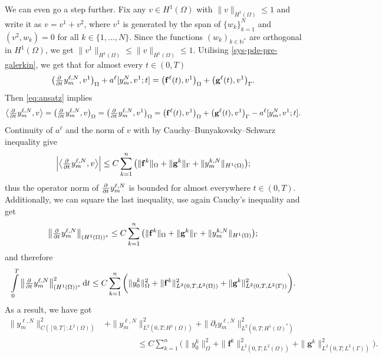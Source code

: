 \documentclass[11pt]{article}
\newcommand{\N}{\mathbb{N}}
\numberwithin{equation}{section}
\begin{document}
	We can even go a step further. Fix any \(v\in H^1(\Omega)\) with \(\|v\|_{H^1(\Omega)} \leq 1\) and write it as \( v = v^1 + v^2\), where \(v^1\) is generated by the span of \( \{w_k\}_{k=1}^N\) and \( (v^2,w_k) = 0\) for all \( k \in \{1,\ldots,N\}\). Since the functions \( (w_k)_{k\in \N^*}\) are orthogonal in \(H^1(\Omega)\), we get \( \|v^1\|_{H^1(\Omega)} \leq \|v\|_{H^1(\Omega)} \leq 1 \). Utilising \eqref{sys-pde-pre-galerkin}, we get that for almost every \(t\in (0,T)\)
	\[
		\big(\pd{ }{t}  y_m^{\ell,N}, v^1\big)_\Omega + 
		a^\ell [ y_m^{N}, v^1; t] 
		=
		\big( \mathbf{f}^\ell (t), v^1 \big)_{\Omega} + \big(\mathbf{g}^\ell (t),  v^1 \big)_{\Gamma}.
	\]
	Then \eqref{eq:ansatz} implies
	\[
		\big\langle \pd{ }{t}  y_m^{\ell,N}, v \big\rangle =
		\big(\pd{ }{t}  y_m^{\ell,N}, v\big)_\Omega =
		\big(\pd{ }{t}  y_m^{\ell,N}, v^1\big)_\Omega 
		=
		\big( \mathbf{f}^\ell (t), v^1 \big)_{\Omega} + \big(\mathbf{g}^\ell (t),  v^1 \big)_{\Gamma}
		- a^\ell [y_m^{N}, v^1; t] .
	\]
	Continuity of \(a^\ell\) and the norm of \(v\) with by Cauchy--Bunyakovsky--Schwarz inequality give
	\[
		\Big| \big\langle \pd{ }{t}  y_m^{\ell,N}, v \big\rangle \Big|
		\leq C \sum_{k=1}^n
		\big( \|\mathbf{f}^k\|_{\Omega} + \|\mathbf{g}^k\|_{\Gamma} + \| y_m^{k,N}\|_{H^1(\Omega)} \big);
	\]
	thus the operator norm of \(\pd{ }{t}  y_m^{\ell,N}\) is bounded for almost everywhere \(t\in (0,T)\). Additionally, we can square the last inequality, use again Cauchy's inequality and get
	\[
		\big\| \pd{ }{t}  y_m^{\ell,N} \big\|_{(H^1(\Omega))^*} 
		\leq C \sum_{k=1}^n \big( \|\mathbf{f}^k\|_{\Omega} + \|\mathbf{g}^k\|_{\Gamma} + \| y_m^{k,N}\|_{H^1(\Omega)} \big) ;
	\]
	and therefore
	\begin{align*}
		\int\limits_0^T \big\| \pd{ }{t}  y_m^{\ell,N} \big\|^2_{(H^1(\Omega))^*} \dif t 
		\leq C\sum_{k=1}^n \bigg(  \|  y_0^k \|^2_\Omega + \|\mathbf{f}^k\|^2_{L^2(0,T, L^2(\Omega))} + \|\mathbf{g}^k\|^2_{L^2(0,T, L^2(\Gamma))} \bigg).
	\end{align*}
	As a result, we have got
	\begin{equation}
	\label{eq:energy-estimates}
	\begin{aligned}
		\|  y_m^{\ell,N} \|^2_{C([0,T];L^2(\Omega) )} 
		&+ \| y_m^{\ell,N} \|^2_{L^2(0,T; H^1(\Omega))}
		+  \| \partial_t  y_m^{\ell,N} \|^2_{L^2(0,T;H^1(\Omega)^*)}
		\\
		&\qquad\qquad\leq 
		C \sum_{k=1}^n \bigg(  \|  y_0^k \|^2_\Omega + \|\mathbf{f}^k\|^2_{L^2(0,T;L^2(\Omega))} + \|\mathbf{g}^k\|^2_{L^2(0,T;L^2(\Gamma))} \bigg).
	\end{aligned}
	\end{equation}
	
\end{document}

